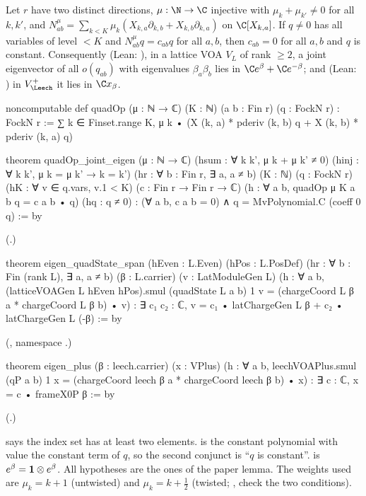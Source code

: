 \begin{lemma}\label{ch20:lem:jointeigen}
Let $r$ have two distinct directions, $\mu:\N\to\C$ injective with $\mu_k+\mu_{k'}\neq0$ for all $k,k'$, and
$N^\mu_{ab}=\sum_{k<K}\mu_k(X_{k,a}\partial_{k,b}+X_{k,b}\partial_{k,a})$ on $\C[X_{k,a}]$.  If $q\neq0$ has all
variables of level $<K$ and $N^\mu_{ab}q=c_{ab}q$ for all $a,b$, then $c_{ab}=0$ for all $a,b$ and $q$ is constant.
Consequently (Lean: ), in a lattice VOA $V_L$ of rank $\ge2$, a joint eigenvector of all
$o(q_{ab})$ with eigenvalues $\beta_a\beta_b$ lies in $\C e^\beta+\C e^{-\beta}$; and (Lean: ) in
$\chtwentyVL$ it lies in $\C x_\beta$.
\end{lemma}
\begin{leancode}
noncomputable def quadOp (μ : ℕ → ℂ) (K : ℕ) (a b : Fin r) (q : FockN r) : FockN r :=
  ∑ k ∈ Finset.range K, μ k • (X (k, a) * pderiv (k, b) q + X (k, b) * pderiv (k, a) q)

theorem quadOp_joint_eigen (μ : ℕ → ℂ) (hsum : ∀ k k', μ k + μ k' ≠ 0)
    (hinj : ∀ k k', μ k = μ k' → k = k') (hr : ∀ b : Fin r, ∃ a, a ≠ b) (K : ℕ)
    (q : FockN r) (hK : ∀ v ∈ q.vars, v.1 < K) (c : Fin r → Fin r → ℂ)
    (h : ∀ a b, quadOp μ K a b q = c a b • q) (hq : q ≠ 0) :
    (∀ a b, c a b = 0) ∧ q = MvPolynomial.C (coeff 0 q) := by
\end{leancode}
(.)
\begin{leancode}
theorem eigen_quadState_span (hEven : L.Even) (hPos : L.PosDef)
    (hr : ∀ b : Fin (rank L), ∃ a, a ≠ b) (β : L.carrier) (v : LatModuleGen L)
    (h : ∀ a b, (latticeVOAGen L hEven hPos).smul (quadState L a b) 1 v
      = (chargeCoord L β a * chargeCoord L β b) • v) :
    ∃ c₁ c₂ : ℂ, v = c₁ • latChargeGen L β + c₂ • latChargeGen L (-β) := by
\end{leancode}
(, namespace .)
\begin{leancode}
theorem eigen_plus (β : leech.carrier) (x : VPlus)
    (h : ∀ a b, leechVOAPlus.smul (qP a b) 1 x = (chargeCoord leech β a * chargeCoord leech β b) • x) :
    ∃ c : ℂ, x = c • frameX0P β := by
\end{leancode}
(.)
\begin{dictionary}
 says the index set has at least two elements.   is the
constant polynomial with value the constant term of $q$, so the second conjunct is ``$q$ is constant''.
 is $e^\beta=\mathbf 1\otimes e^\beta$.  All hypotheses are the ones of the paper lemma.  The
weights used are $\mu_k=k+1$ (untwisted) and $\mu_k=k+\tfrac12$ (twisted; ,
 check the two conditions).
\end{dictionary}
